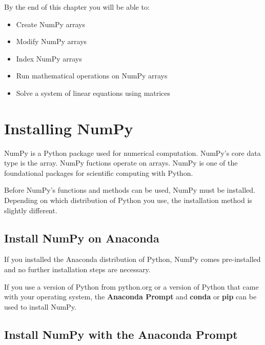 \documentclass{book}
\begin{document}
    
        By the end of this chapter you will be able to:

\begin{itemize}
\item
  Create NumPy arrays
\item
  Modify NumPy arrays
\item
  Index NumPy arrays
\item
  Run mathematical operations on NumPy arrays
\item
  Solve a system of linear equations using matrices
\end{itemize}
        \newpage

    




    
        \hypertarget{installing-numpy}{%
\section{Installing NumPy}\label{installing-numpy}}
    




    
        NumPy is a Python package used for numerical computation. NumPy's core
data type is the array. NumPy fuctions operate on arrays. NumPy is one
of the foundational packages for scientific computing with Python.

Before NumPy's functions and methods can be used, NumPy must be
installed. Depending on which distribution of Python you use, the
installation method is slightly different.
    




    
        \hypertarget{install-numpy-on-anaconda}{%
\subsection{Install NumPy on Anaconda}\label{install-numpy-on-anaconda}}

If you installed the Anaconda distribution of Python, NumPy comes
pre-installed and no further installation steps are necessary.

If you use a version of Python from python.org or a version of Python
that came with your operating system, the \textbf{Anaconda Prompt} and
\textbf{conda} or \textbf{pip} can be used to install NumPy.
    




    
        \hypertarget{install-numpy-with-the-anaconda-prompt}{%
\subsection{Install NumPy with the Anaconda
Prompt}\label{install-numpy-with-the-anaconda-prompt}}
\end{document}
